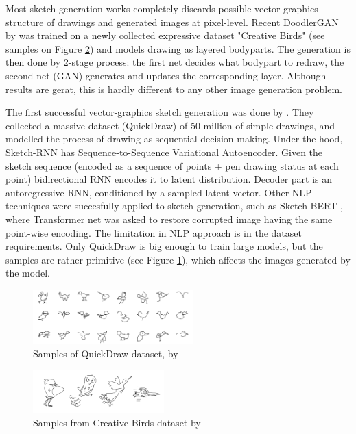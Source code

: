 \documentclass{article}
\begin{document}
Most sketch generation works completely discards possible vector graphics structure of drawings and generated images at pixel-level. Recent DoodlerGAN by \cite{doodlergan} was trained on a newly collected expressive dataset "Creative Birds" (see samples on Figure \ref{fig:doodlergan}) and models drawing as layered bodyparts. The generation is then done by 2-stage process: the first net decides what bodypart to redraw, the second net (GAN) generates and updates the corresponding layer. Although results are gerat, this is hardly different to any other image generation problem. 

The first successful vector-graphics sketch generation was done by \cite{sketchrnn}. They collected a massive dataset (QuickDraw) of 50 million of simple drawings, and modelled the process of drawing as sequential decision making. Under the hood, Sketch-RNN has Sequence-to-Sequence Variational Autoencoder. Given the sketch sequence (encoded as a sequence of points + pen drawing status at each point) bidirectional RNN encodes it to latent distribution. Decoder part is an autoregressive RNN, conditioned by a sampled latent vector. Other NLP techniques were succesfully applied to sketch generation, such as Sketch-BERT \cite{sketchbert}, where Transformer net was asked to restore corrupted image having the same point-wise encoding. The limitation in NLP approach is in the dataset requirements. Only QuickDraw is big enough to train large models, but the samples are rather primitive (see Figure \ref{fig:quickdraw}), which affects the images generated by the model.

\begin{figure}[h]
	\centering
	\includegraphics[width=0.55\textwidth]{img/quickdraw.png}
	\caption{Samples of QuickDraw dataset, by \cite{sketchrnn}}
	\label{fig:quickdraw}
\end{figure}
\begin{figure}[h]
	\centering
	\includegraphics[width=0.45\textwidth]{img/doodlergan1.png}
	\caption{Samples from Creative Birds dataset by \cite{doodlergan}}
	\label{fig:doodlergan}
\end{figure}
\end{document}
